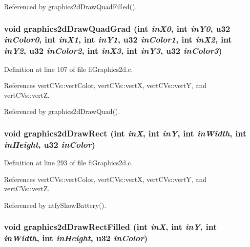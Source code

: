 Referenced by graphics2d\-Draw\-Quad\-Filled().
\subsubsection{\setlength{\rightskip}{0pt plus 5cm}void graphics2d\-Draw\-Quad\-Grad (int {\em in\-X0}, int {\em in\-Y0}, u32 {\em in\-Color0}, int {\em in\-X1}, int {\em in\-Y1}, u32 {\em in\-Color1}, int {\em in\-X2}, int {\em in\-Y2}, u32 {\em in\-Color2}, int {\em in\-X3}, int {\em in\-Y3}, u32 {\em in\-Color3})}\label{flGraphics2d_8h_21343e825ae31bc9f80b14f0ccc0e4e6}




Definition at line 107 of file fl\-Graphics2d.c.

References vert\-CVs::vert\-Color, vert\-CVs::vert\-X, vert\-CVs::vert\-Y, and vert\-CVs::vert\-Z.

Referenced by graphics2d\-Draw\-Quad().
\subsubsection{\setlength{\rightskip}{0pt plus 5cm}void graphics2d\-Draw\-Rect (int {\em in\-X}, int {\em in\-Y}, int {\em in\-Width}, int {\em in\-Height}, u32 {\em in\-Color})}\label{flGraphics2d_8h_32b7a6e54f6fda2ea7210fca6e0c3e04}




Definition at line 293 of file fl\-Graphics2d.c.

References vert\-CVs::vert\-Color, vert\-CVs::vert\-X, vert\-CVs::vert\-Y, and vert\-CVs::vert\-Z.

Referenced by ntfy\-Show\-Battery().
\subsubsection{\setlength{\rightskip}{0pt plus 5cm}void graphics2d\-Draw\-Rect\-Filled (int {\em in\-X}, int {\em in\-Y}, int {\em in\-Width}, int {\em in\-Height}, u32 {\em in\-Color})}\label{flGraphics2d_8h_ea93dd1ab20e3d997f5a663690ed5386}




